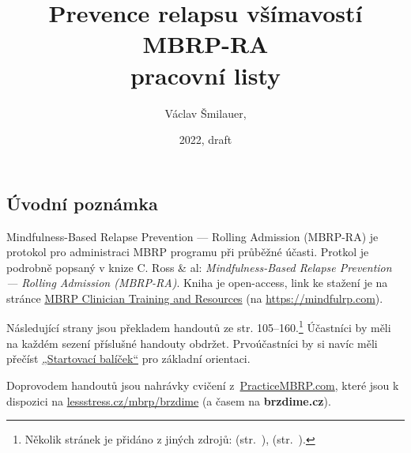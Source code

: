 \documentclass[11pt,a5paper,twoside]{article}
\title{\ifplastex\else\vskip-2cm\fi Prevence relapsu všímavostí\\ MBRP-RA \\ pracovní listy}
\date{2022, draft}
\author{Václav Šmilauer, \lessstressLogo}
\begin{document}
	\maketitle

	\subsection*{Úvodní poznámka}
		Mindfulness-Based Relapse Prevention — Rolling Admission (MBRP-RA) je protokol pro administraci MBRP programu při průběžné účasti. Protkol je podrobně popsaný v knize C. Ross \& al: \emph{Mindfulness-Based Relapse Prevention — Rolling Admission (MBRP-RA)}. Kniha je open-access, link ke stažení je na stránce \href{https://mindfulrp.com/for-clinicians}{MBRP Clinician Training and Resources} (na \url{https://mindfulrp.com}).

		Následující strany jsou překladem handoutů ze str. 105–160.\footnote{Několik stránek je přidáno z jiných zdrojů:
			 (str.~\pageref{slovni-zasoba-pocity}),
			 (str.~\pageref{slovni-zasoba-potreby}).
		} Účastníci by měli na každém sezení příslušné handouty obdržet. Prvoúčastníci by si navíc měli přečíst \href{https://lessstress.cz/mbrp/brzdime/start}{„Startovací balíček“} pro základní orientaci.

		Doprovodem handoutů jsou nahrávky cvičení z~\href{https://practicembrp.com}{PracticeMBRP.com}, které jsou k dispozici na \href{https://lessstress.cz/mbrp/brzdime}{lessstress.cz/mbrp/brzdime} (a časem na \textbf{brzdime.cz}).

	\setlength{\cftbeforesecskip}{1ex}

	\clearpage
	\tableofcontents
	
\end{document}
